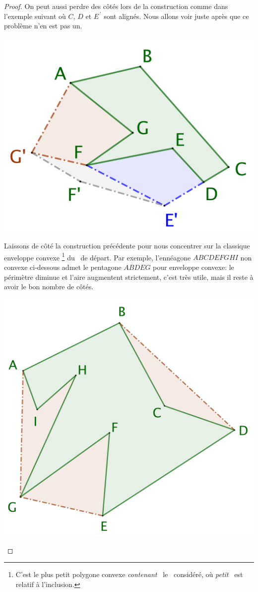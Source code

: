 \begin{proof}
	On peut aussi perdre des côtés lors de la construction comme dans l'exemple suivant où $C$, $D$ et $E^{\,\prime}$ sont alignés. Nous allons voir juste après que ce problème n'en est pas un.

	\begin{center}
		\includegraphics[scale=.4]{content/polygon/necessary-cond/non-convex-bad.png}
	\end{center}


	Laissons de côté la construction précédente pour nous concentrer sur la classique enveloppe convexe%
	\footnote{
		C'est le plus petit polygone convexe \og \emph{contenant} \fg\ le \ngone\ considéré, où \og \emph{petit} \fg\ est relatif à l'inclusion.
	}
	du \ngone\ de départ.
	Par exemple, l'ennéagone $ABCDEFGHI$ non convexe ci-dessous admet le pentagone $ABDEG$ pour enveloppe convexe: le périmètre diminue et l'aire augmentent strictement, c'est très utile, mais il reste à avoir le bon nombre de côtés.
	
	\begin{center}
		\includegraphics[scale=.4]{content/polygon/necessary-cond/convex-hull.png}
	\end{center}


\end{proof}
